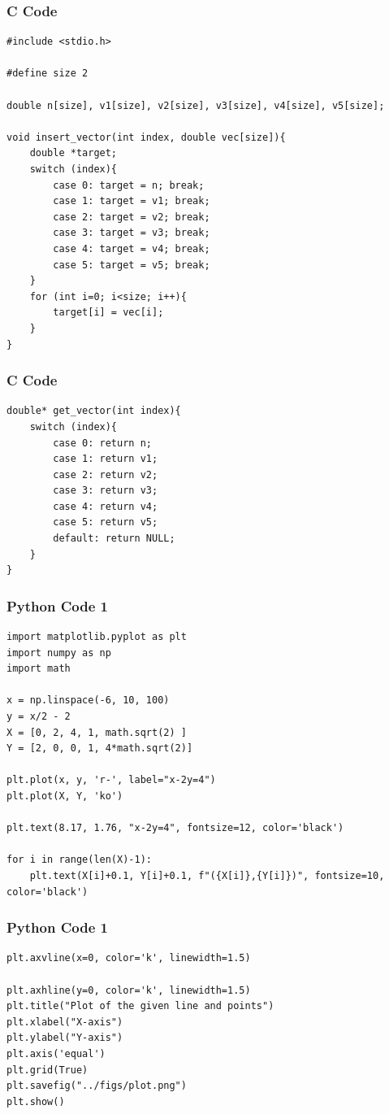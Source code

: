 \documentclass{beamer}
\begin{document}
\begin{frame}[fragile]
    \frametitle{C Code}
    \begin{lstlisting}
#include <stdio.h>

#define size 2

double n[size], v1[size], v2[size], v3[size], v4[size], v5[size];

void insert_vector(int index, double vec[size]){
    double *target;
    switch (index){
        case 0: target = n; break;
        case 1: target = v1; break;
        case 2: target = v2; break;
        case 3: target = v3; break;
        case 4: target = v4; break;
        case 5: target = v5; break;
    }
    for (int i=0; i<size; i++){
        target[i] = vec[i];
    }
}
    \end{lstlisting}
\end{frame}

\begin{frame}[fragile]
    \frametitle{C Code}
    \begin{lstlisting}
double* get_vector(int index){
    switch (index){
        case 0: return n;
        case 1: return v1;
        case 2: return v2;
        case 3: return v3;
        case 4: return v4;
        case 5: return v5;
        default: return NULL;
    }
}
    \end{lstlisting}
\end{frame}

\begin{frame}[fragile]
    \frametitle{Python Code 1}
    \begin{lstlisting}
import matplotlib.pyplot as plt
import numpy as np
import math

x = np.linspace(-6, 10, 100)   
y = x/2 - 2
X = [0, 2, 4, 1, math.sqrt(2) ]
Y = [2, 0, 0, 1, 4*math.sqrt(2)]

plt.plot(x, y, 'r-', label="x-2y=4")
plt.plot(X, Y, 'ko')  

plt.text(8.17, 1.76, "x-2y=4", fontsize=12, color='black')

for i in range(len(X)-1):
    plt.text(X[i]+0.1, Y[i]+0.1, f"({X[i]},{Y[i]})", fontsize=10, color='black')
    \end{lstlisting}
\end{frame}

\begin{frame}[fragile]
    \frametitle{Python Code 1}
    \begin{lstlisting}
plt.axvline(x=0, color='k', linewidth=1.5)

plt.axhline(y=0, color='k', linewidth=1.5)
plt.title("Plot of the given line and points")
plt.xlabel("X-axis")
plt.ylabel("Y-axis")
plt.axis('equal')
plt.grid(True)
plt.savefig("../figs/plot.png")
plt.show()
    \end{lstlisting}
\end{frame}
\end{document}
